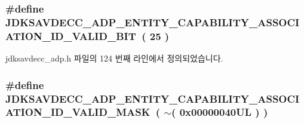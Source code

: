 \subsubsection[{\texorpdfstring{J\+D\+K\+S\+A\+V\+D\+E\+C\+C\+\_\+\+A\+D\+P\+\_\+\+E\+N\+T\+I\+T\+Y\+\_\+\+C\+A\+P\+A\+B\+I\+L\+I\+T\+Y\+\_\+\+A\+S\+S\+O\+C\+I\+A\+T\+I\+O\+N\+\_\+\+I\+D\+\_\+\+V\+A\+L\+I\+D\+\_\+\+B\+IT}{JDKSAVDECC_ADP_ENTITY_CAPABILITY_ASSOCIATION_ID_VALID_BIT}}]{\setlength{\rightskip}{0pt plus 5cm}\#define J\+D\+K\+S\+A\+V\+D\+E\+C\+C\+\_\+\+A\+D\+P\+\_\+\+E\+N\+T\+I\+T\+Y\+\_\+\+C\+A\+P\+A\+B\+I\+L\+I\+T\+Y\+\_\+\+A\+S\+S\+O\+C\+I\+A\+T\+I\+O\+N\+\_\+\+I\+D\+\_\+\+V\+A\+L\+I\+D\+\_\+\+B\+IT~( 25 )}\hypertarget{group__adp__entity__capability_gac6ef045be4cfcb8da7516cfec726aec9}{}\label{group__adp__entity__capability_gac6ef045be4cfcb8da7516cfec726aec9}


jdksavdecc\+\_\+adp.\+h 파일의 124 번째 라인에서 정의되었습니다.

\subsubsection[{\texorpdfstring{J\+D\+K\+S\+A\+V\+D\+E\+C\+C\+\_\+\+A\+D\+P\+\_\+\+E\+N\+T\+I\+T\+Y\+\_\+\+C\+A\+P\+A\+B\+I\+L\+I\+T\+Y\+\_\+\+A\+S\+S\+O\+C\+I\+A\+T\+I\+O\+N\+\_\+\+I\+D\+\_\+\+V\+A\+L\+I\+D\+\_\+\+M\+A\+SK}{JDKSAVDECC_ADP_ENTITY_CAPABILITY_ASSOCIATION_ID_VALID_MASK}}]{\setlength{\rightskip}{0pt plus 5cm}\#define J\+D\+K\+S\+A\+V\+D\+E\+C\+C\+\_\+\+A\+D\+P\+\_\+\+E\+N\+T\+I\+T\+Y\+\_\+\+C\+A\+P\+A\+B\+I\+L\+I\+T\+Y\+\_\+\+A\+S\+S\+O\+C\+I\+A\+T\+I\+O\+N\+\_\+\+I\+D\+\_\+\+V\+A\+L\+I\+D\+\_\+\+M\+A\+SK~( $\sim$( 0x00000040\+U\+L ) )}\hypertarget{group__adp__entity__capability_gae2c01bf5d3911dd2f81c23e294faf117}{}\label{group__adp__entity__capability_gae2c01bf5d3911dd2f81c23e294faf117}


